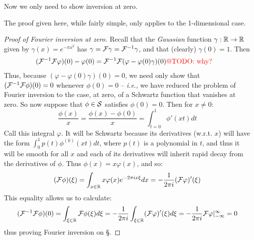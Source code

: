 \documentclass[thesis.tex]{subfiles}
\begin{document}
    Now we only need to show inversion at zero.
    \begin{rmk}
      The proof given here, while fairly simple, only applies to the 1-dimensional case. 
    \end{rmk}
    \begin{proof}[Proof of Fourier inversion at zero]
      Recall that the \emph{Gaussian} function $\gamma:\R\rightarrow\R$ given by $\gamma(x) = e^{-\pi x^2}$ has $\gamma=\F\gamma=\F^{-1}\gamma$, and that (clearly) $\gamma(0)=1$.
      Then 
      \begin{align*}
        (\F^{-1}\F\varphi)(0) - \varphi(0) &= \F^{-1}\F(\varphi-\varphi(0)\gamma)(0) \text{\todo{why?}}
      \end{align*}
      Thus, because $(\varphi-\varphi(0)\gamma)(0)=0$, we need only show that $(\F^{-1}\F\phi)(0) = 0$ whenever $\phi(0)=0$ -- \emph{i.e.}, we have reduced the problem of Fourier inversion to the case, at zero, of a Schwartz function that vanishes at zero.
      So now suppose that $\phi\in\S$ satisfies $\phi(0)=0$. 
      Then for $x\ne0$:
      \begin{equation*}
        \frac{\phi(x)}{x} = \frac{\phi(x)-\phi(0)}{x} = \int_{t=0}^1 \phi'(xt)dt
      \end{equation*}
      Call this integral $\varphi$.
      It will be Schwartz because its derivatives (w.r.t. $x$) will have the form $\int_0^1 p(t)\phi^{(k)}(xt)dt$, where $p(t)$ is a polynomial in $t$, and thus it will be smooth for all $x$ and each of its derivatives will inherit rapid decay from the derivatives of $\phi$.
      Thus $\phi(x) = x\varphi(x)$, and so:
      \begin{equation*}
        (\F\phi)(\xi) = \int_{x\in\R} x\varphi(x)e^{-2\pi i x \xi}dx = -\frac{1}{2\pi i}(\F\varphi)'(\xi)
      \end{equation*}
      This equality allows us to calculate:
      \begin{equation*}
        (\F^{-1}\F\phi)(0) = \int_{\xi\in\R} \F\phi(\xi)d\xi = -\frac{1}{2\pi i}\int_{\xi\in\R} (\F\varphi)'(\xi)d\xi = -\frac{1}{2\pi i} \F\varphi\vert_{-\infty}^\infty = 0
      \end{equation*}
      thus proving Fourier inversion on \S.
    \end{proof}
\end{document}
